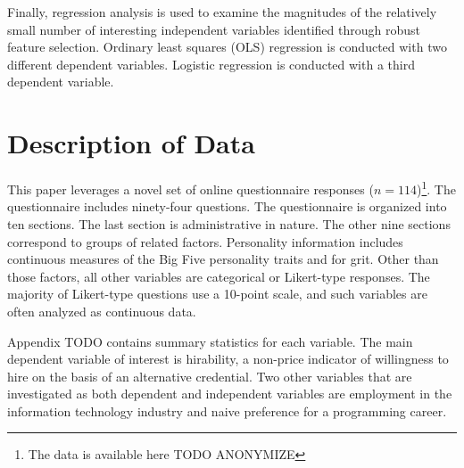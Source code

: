 \documentclass[review]{elsarticle}
\begin{document}
Finally, regression analysis is used to examine the magnitudes of the relatively small
number of interesting independent variables identified through robust feature selection.
Ordinary least squares (OLS) regression is conducted with two different dependent variables.
Logistic regression is conducted with a third dependent variable.


\section{Description of Data}

This paper leverages a novel set of online questionnaire responses ($n = 114$)\footnote{
    The data is available here TODO ANONYMIZE
}.
The questionnaire includes ninety-four questions.
The questionnaire is organized into ten sections.
The last section is administrative in nature.
The other nine sections correspond to groups of related factors.
Personality information includes continuous measures of the Big Five personality traits and for grit.
Other than those factors, all other variables are categorical or Likert-type responses.
The majority of Likert-type questions use a 10-point scale, and such variables are often analyzed as continuous data.

Appendix TODO contains summary statistics for each variable.
The main dependent variable of interest is hirability,
a non-price indicator of willingness to hire on the basis of an alternative credential.
Two other variables that are investigated as both dependent and independent variables are
employment in the information technology industry
and naive preference for a programming career.
\end{document}
